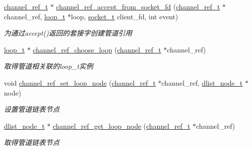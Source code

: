 \begin{DoxyCompactItemize}
\hyperlink{a00047_a151271c9d188ef28d4d24bb81dcc1263_a151271c9d188ef28d4d24bb81dcc1263}{channel\+\_\+ref\+\_\+t} $\ast$ \hyperlink{a00045_a8312d0f4fcecc79d87a261e8b462ce95_a8312d0f4fcecc79d87a261e8b462ce95}{channel\+\_\+ref\+\_\+accept\+\_\+from\+\_\+socket\+\_\+fd} (\hyperlink{a00047_a151271c9d188ef28d4d24bb81dcc1263_a151271c9d188ef28d4d24bb81dcc1263}{channel\+\_\+ref\+\_\+t} $\ast$channel\+\_\+ref, \hyperlink{a00047_a9c3ad1cd2de83e09f3a7b59fa82c94ee_a9c3ad1cd2de83e09f3a7b59fa82c94ee}{loop\+\_\+t} $\ast$loop, \hyperlink{a00047_a0d9e0afbf02fb6ed6c5b1415dce51b05_a0d9e0afbf02fb6ed6c5b1415dce51b05}{socket\+\_\+t} client\+\_\+fd, int event)
\begin{DoxyCompactList}\small\item\em 为通过accept()返回的套接字创建管道引用 \end{DoxyCompactList}\item 
\hyperlink{a00047_a9c3ad1cd2de83e09f3a7b59fa82c94ee_a9c3ad1cd2de83e09f3a7b59fa82c94ee}{loop\+\_\+t} $\ast$ \hyperlink{a00045_af3fce9f1faac3773f726b1b913d42787_af3fce9f1faac3773f726b1b913d42787}{channel\+\_\+ref\+\_\+choose\+\_\+loop} (\hyperlink{a00047_a151271c9d188ef28d4d24bb81dcc1263_a151271c9d188ef28d4d24bb81dcc1263}{channel\+\_\+ref\+\_\+t} $\ast$channel\+\_\+ref)
\begin{DoxyCompactList}\small\item\em 取得管道相关联的loop\+\_\+t实例 \end{DoxyCompactList}\item 
void \hyperlink{a00045_a98676b725d853de8a576f97e1eeb9068_a98676b725d853de8a576f97e1eeb9068}{channel\+\_\+ref\+\_\+set\+\_\+loop\+\_\+node} (\hyperlink{a00047_a151271c9d188ef28d4d24bb81dcc1263_a151271c9d188ef28d4d24bb81dcc1263}{channel\+\_\+ref\+\_\+t} $\ast$channel\+\_\+ref, \hyperlink{a00047_a62053232bcf3566010ef98a7d77c3cc8_a62053232bcf3566010ef98a7d77c3cc8}{dlist\+\_\+node\+\_\+t} $\ast$node)
\begin{DoxyCompactList}\small\item\em 设置管道链表节点 \end{DoxyCompactList}\item 
\hyperlink{a00047_a62053232bcf3566010ef98a7d77c3cc8_a62053232bcf3566010ef98a7d77c3cc8}{dlist\+\_\+node\+\_\+t} $\ast$ \hyperlink{a00045_a814d6826477cb62c5e4d6826dfdc418e_a814d6826477cb62c5e4d6826dfdc418e}{channel\+\_\+ref\+\_\+get\+\_\+loop\+\_\+node} (\hyperlink{a00047_a151271c9d188ef28d4d24bb81dcc1263_a151271c9d188ef28d4d24bb81dcc1263}{channel\+\_\+ref\+\_\+t} $\ast$channel\+\_\+ref)
\begin{DoxyCompactList}\small\item\em 取得管道链表节点 \end{DoxyCompactList}\item 

\end{DoxyCompactItemize}
